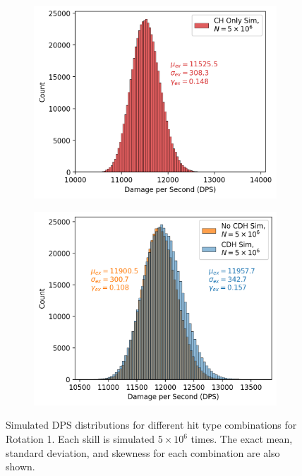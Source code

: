 \documentclass{article}
\begin{document}
            \begin{figure}[H]
                \begin{subfigure}[b]{0.49\textwidth}
                    \centering
                    \includegraphics[width=\textwidth]{img/rotation-1-CH.PNG}
                \end{subfigure}
                \hfill
                \begin{subfigure}[b]{0.49\textwidth}
                    \centering
                    \includegraphics[width=\textwidth]{img/rotation-1.PNG}
                \end{subfigure}
                \caption{Simulated DPS distributions for different hit type combinations for Rotation 1. Each skill is simulated $5 \times 10^6$ times. The exact mean, standard deviation, and skewness for each combination are also shown.}\label{fig:rot-1}
            \end{figure}
\end{document}
